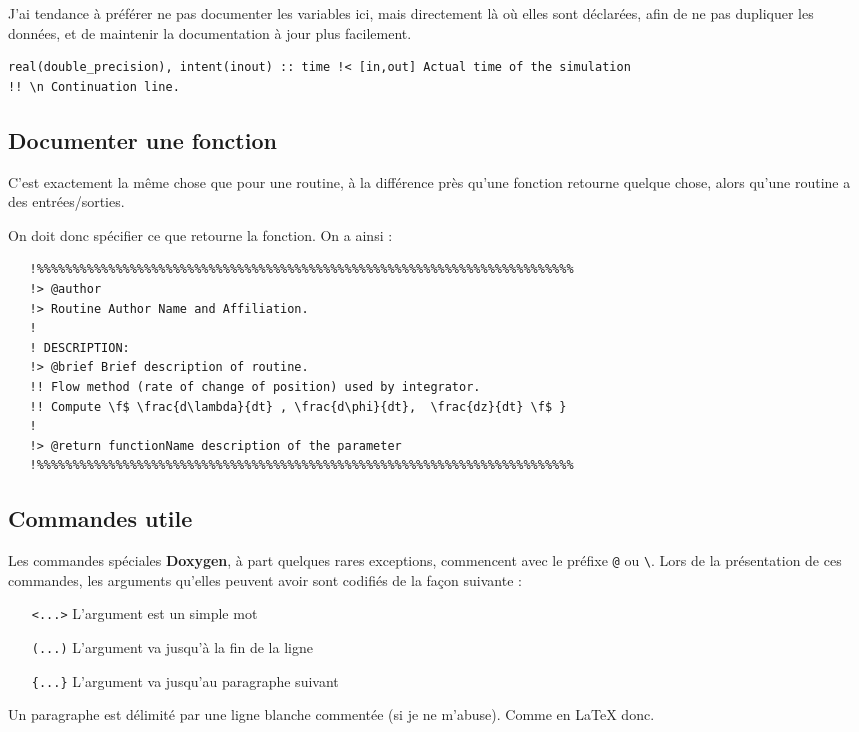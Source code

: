 \documentclass[a4paper,twoside]{article}
\begin{document}
J'ai tendance à préférer ne pas documenter les variables ici, mais directement là où elles sont déclarées, afin de ne pas dupliquer les données, et de maintenir la documentation à jour plus facilement.
\begin{verbatim}
real(double_precision), intent(inout) :: time !< [in,out] Actual time of the simulation
!! \n Continuation line. 
\end{verbatim}

\subsection{Documenter une fonction}
C'est exactement la même chose que pour une routine, à la différence près qu'une fonction retourne quelque chose, alors qu'une routine a des entrées/sorties. 

On doit donc spécifier ce que retourne la fonction. On a ainsi : 
\begin{verbatim}
   !%%%%%%%%%%%%%%%%%%%%%%%%%%%%%%%%%%%%%%%%%%%%%%%%%%%%%%%%%%%%%%%%%%%%%%%%%%%
   !> @author 
   !> Routine Author Name and Affiliation.
   !
   ! DESCRIPTION: 
   !> @brief Brief description of routine. 
   !! Flow method (rate of change of position) used by integrator.
   !! Compute \f$ \frac{d\lambda}{dt} , \frac{d\phi}{dt},  \frac{dz}{dt} \f$ }
   !
   !> @return functionName description of the parameter
   !%%%%%%%%%%%%%%%%%%%%%%%%%%%%%%%%%%%%%%%%%%%%%%%%%%%%%%%%%%%%%%%%%%%%%%%%%%% 
\end{verbatim}

\subsection{Commandes utile}
Les commandes spéciales \textbf{Doxygen}, à part quelques rares exceptions, commencent avec le préfixe \verb|@| ou \verb|\|. Lors de la présentation de ces commandes, les arguments qu'elles peuvent avoir sont codifiés de la façon suivante : 
\begin{itemize}
\item[\texttt{<...>}] L'argument est un simple mot
\item[\texttt{(...)}] L'argument va jusqu'à la fin de la ligne
\item[\texttt{\{...\}}] L'argument va jusqu'au paragraphe suivant
\end{itemize}

Un paragraphe est délimité par une ligne blanche commentée (si je ne m'abuse). Comme en \LaTeX{} donc.
\end{document}

